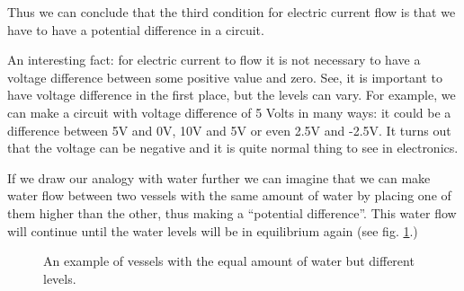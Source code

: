 \documentclass[../sparc.tex]{subfiles}
\begin{document}
Thus we can conclude that the third condition for electric current flow is that
we have to have a potential difference in a circuit.

An interesting fact: for electric current to flow it is not necessary to have a
voltage difference between some positive value and zero.  See, it is important
to have voltage difference in the first place, but the levels can vary.  For
example, we can make a circuit with voltage difference of 5 Volts in many ways:
it could be a difference between 5V and 0V, 10V and 5V or even 2.5V and -2.5V.
It turns out that the voltage can be negative and it is quite normal thing to
see in electronics.

If we draw our analogy with water further we can imagine that we can make water
flow between two vessels with the same amount of water by placing one of them
higher than the other, thus making a ``potential difference''.  This water flow
will continue until the water levels will be in equilibrium again (see
fig. \ref{fig:electronics-circuits-3}.)

\begin{figure}[ht]
  \centering
  \caption{An example of vessels with the equal amount of water but different
    levels.}
  \label{fig:electronics-circuits-3}
\end{figure}
\end{document}
